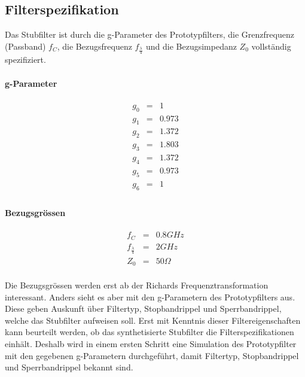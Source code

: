 \subsection{Filterspezifikation}
Das Stubfilter ist durch die g-Parameter des Prototypfilters, die Grenzfrequenz (Passband) $f_C$, die Bezugsfrequenz $f_{\frac{\lambda}{4}}$ und die Bezugsimpedanz $Z_0$ vollständig spezifiziert.

\paragraph{g-Parameter}
\begin{mdframed}
\begin{equation*} 
\begin{array}{rclcl} 
g_0 & = & 1 \\ 
g_1 & = & 0.973 \\ 
g_2 & = & 1.372 \\ 
g_3 & = & 1.803 \\ 
g_4 & = & 1.372 \\ 
g_5 & = & 0.973 \\ 
g_6 & = & 1 \\ 
\end{array} 
\end{equation*} 
\end{mdframed}

\paragraph{Bezugsgrössen}
\begin{mdframed}
\begin{equation*} 
\begin{array}{rclcl} 
f_C & = & 0.8 GHz \\ 
f_{\frac{\lambda}{4}} & = & 2GHz \\ 
Z_0 & = & 50 \Omega \\ 
\end{array} 
\end{equation*} 
\end{mdframed}

Die Bezugsgrössen werden erst ab der Richards Frequenztransformation interessant. Anders sieht es aber mit den g-Parametern des Prototypfilters aus. Diese geben Auskunft über Filtertyp, Stopbandrippel und Sperrbandrippel, welche das Stubfilter aufweisen soll. Erst mit Kenntnis dieser Filtereigenschaften kann beurteilt werden, ob das synthetisierte Stubfilter die Filterspezifikationen einhält. Deshalb wird in einem ersten Schritt eine Simulation des Prototypfilter mit den gegebenen g-Parametern durchgeführt, damit Filtertyp, Stopbandrippel und Sperrbandrippel bekannt sind.


